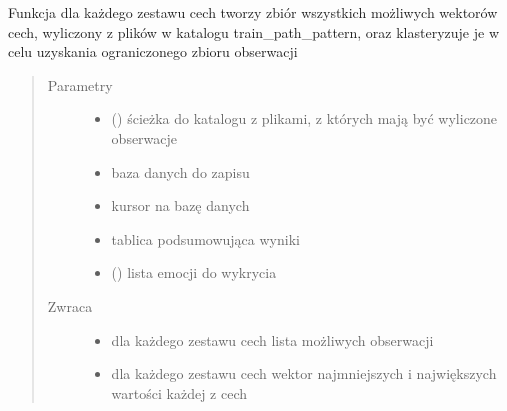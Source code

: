 \documentclass[letterpaper,10pt,polish]{sphinxmanual}
\begin{document}
\begin{fulllineitems}
\label{\detokenize{hmm_main:hmm_main.hmm_get_all_possible_observations}}
Funkcja dla każdego zestawu cech tworzy zbiór wszystkich możliwych wektorów cech, wyliczony z plików w katalogu
train\_path\_pattern, oraz klasteryzuje je w celu uzyskania ograniczonego zbioru obserwacji
\begin{quote}\begin{description}
\item[{Parametry}] \leavevmode\begin{itemize}
\item {} 
 () \textendash{} ścieżka do katalogu z plikami, z których mają być wyliczone obserwacje

\item {} 
 \textendash{} baza danych do zapisu

\item {} 
 \textendash{} kursor na bazę danych

\item {} 
 \textendash{} tablica podsumowująca wyniki

\item {} 
 () \textendash{} lista emocji do wykrycia

\end{itemize}

\item[{Zwraca}] \leavevmode
\begin{itemize}
\item {} 
dla każdego zestawu cech lista możliwych obserwacji

\item {} 
dla każdego zestawu cech wektor najmniejszych i największych wartości każdej z cech

\end{itemize}


\end{description}\end{quote}

\end{fulllineitems}
\end{document}
